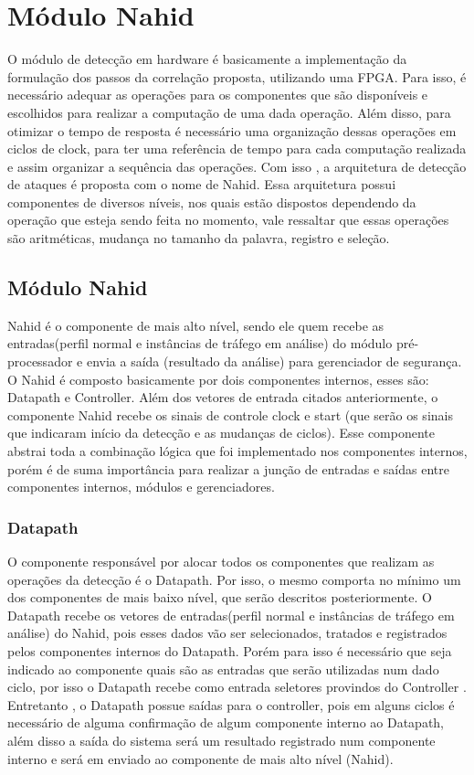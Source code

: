 \chapter{Módulo Nahid}
\label{CAP3}

O  módulo de detecção em hardware é basicamente a implementação da formulação dos passos da correlação proposta, utilizando uma FPGA. Para isso, é necessário adequar  as operações para os componentes que são disponíveis e escolhidos para realizar a computação de uma dada operação.  Além disso, para otimizar o tempo de resposta é necessário uma organização dessas operações em ciclos de clock, para ter uma referência de tempo  para cada computação realizada e assim organizar a sequência das operações. Com isso , a arquitetura de detecção de ataques é proposta com o nome de Nahid. Essa arquitetura possui componentes de diversos níveis, nos quais estão dispostos dependendo da operação que esteja sendo feita no momento, vale ressaltar que essas operações são aritméticas, mudança no tamanho da palavra, registro e seleção.  

\section{Módulo Nahid}\label{Sub:equa}

Nahid é o componente de mais alto nível, sendo ele quem recebe as entradas(perfil normal e instâncias de tráfego em análise) do módulo pré-processador e envia a saída (resultado da análise) para gerenciador de segurança. O Nahid é composto basicamente por dois componentes  internos, esses são: Datapath e Controller.  Além dos vetores de entrada citados anteriormente, o componente  Nahid recebe os sinais de controle clock e start (que serão os sinais que indicaram início da detecção e as mudanças de ciclos). Esse componente  abstrai toda a combinação lógica que foi implementado nos componentes  internos, porém é de suma importância para realizar a junção de entradas e saídas entre componentes internos, módulos e  gerenciadores. 

\subsection{Datapath}

O componente responsável por alocar todos os componentes que realizam as operações da detecção  é o Datapath. Por isso, o mesmo comporta no mínimo um dos componentes de mais baixo nível, que serão descritos posteriormente. O Datapath recebe os vetores de entradas(perfil normal e instâncias de tráfego em análise) do Nahid, pois esses dados vão ser selecionados, tratados e registrados pelos componentes internos do Datapath. Porém para isso é necessário que seja indicado ao componente quais são as entradas que serão utilizadas num dado ciclo, por isso o Datapath recebe como entrada seletores provindos do Controller . Entretanto , o Datapath possue saídas para o controller, pois em alguns ciclos é necessário de alguma confirmação de algum componente  interno ao Datapath, além disso a saída do sistema será um resultado registrado num componente interno e será em enviado ao componente de mais alto nível (Nahid).
